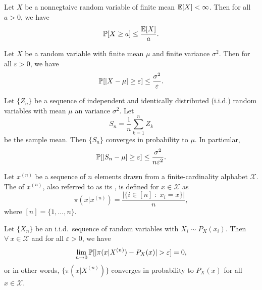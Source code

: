 \documentclass[11pt,a4paper]{article}
\begin{document}
\begin{lemma}
    Let $X$ be a nonnegtaive random variable of finite mean $\mathbb{E}[X]<\infty$. Then for all $a>0$, we have
    \begin{equation*}
        \mathbb{P}[X\ge a] \le \dfrac{\mathbb{E}[X]}{a}.
    \end{equation*}
\end{lemma}

\begin{lemma}
    Let $X$ be a random variable with finite mean $\mu$ and finite variance $\sigma^2$. Then for all $\varepsilon>0$, we have
    \begin{equation*}
        \mathbb{P}[|X-\mu|\ge \varepsilon] \le \dfrac{\sigma^2}{\varepsilon}.
    \end{equation*}
\end{lemma}

\begin{lemma}
    Let $\{Z_n\}$ be a sequence of independent and identically distributed (i.i.d.) random variables with mean $\mu$ an variance $\sigma^2$. Let 
    \begin{equation*}
        S_n = \dfrac{1}{n}\sum_{k=1}^n Z_k
    \end{equation*}
    be the sample mean. Then $\{S_n\}$ converges in probability to $\mu$. In particular, 
    \begin{equation*}
        \mathbb{P}[|S_n-\mu|\ge \varepsilon] \le \dfrac{\sigma^2}{n\varepsilon^2}.
    \end{equation*}
\end{lemma}

\begin{definition}[Type]
    Let $x^{(n)}$ be a sequence of $n$ elements drawn from a finite-cardinality alphabet $\mathcal{X}$. The  of $x^{(n)}$, also referred to as its , is defined for $x\in \mathcal{X}$ as
    \begin{equation*}
        \pi(x|x^{(n)}) = \dfrac{|\{i\in [n]\;:\;x_i = x\}|}{n}, 
    \end{equation*}
    where $[n] = \{1,\ldots, n\}$.
\end{definition}

\begin{theorem}
    Let $\{X_n\}$ be an i.i.d.~sequence of random variables with $X_i\sim P_X(x_i)$. Then $\forall\ x\in\mathcal{X}$ and for all $\varepsilon>0$, we have
    \begin{equation*}
        \lim_{n\rightarrow 0} \mathbb{P}[|\pi(x|X^{(n)}) - P_X(x)| > \varepsilon] = 0, 
    \end{equation*}
    or in other words, $\{\pi(x|X^{(n)})\}$ converges in probability to $P_X(x)$ for all $x\in\mathcal{X}$.
\end{theorem}
\end{document}
